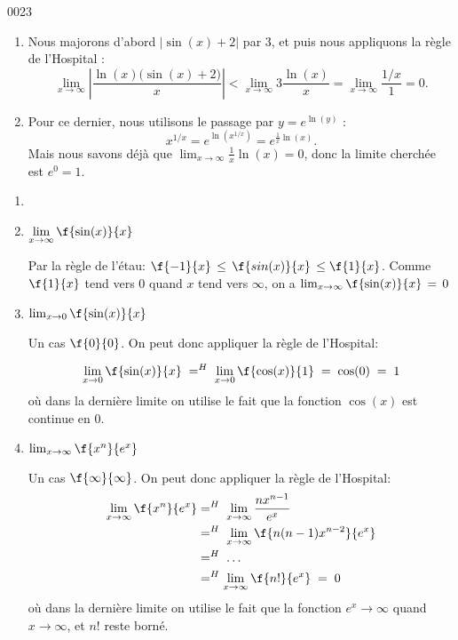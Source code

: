 \begin{corrige}{0023}
\begin{enumerate}
\item
Nous majorons d'abord $|\sin(x)+2|$ par $3$, et puis nous appliquons la règle de l'Hospital :
\begin{equation}
	\lim_{x\to\infty}\left| \frac{ \ln(x)\big( \sin(x)+2 \big) }{ x } \right|<\lim_{x\to\infty}3\frac{ \ln(x) }{ x }=\lim_{x\to\infty}\frac{ 1/x }{ 1 }=0.
\end{equation}

\item
Pour ce dernier, nous utilisons le passage par $y= e^{\ln(y)}$ :
\begin{equation}
	x^{1/x}= e^{\ln(x^{1/x})}= e^{\frac{1}{ x }\ln(x)}.
\end{equation}
Mais nous savons déjà que $\lim_{x\to\infty}\frac{1}{ x }\ln(x)=0$, donc la limite cherchée est $ e^{0}=1$.

\end{enumerate}

\begin{alternative}

	\begin{enumerate}

		\item

		\item $\displaystyle{ \lim_{x\rightarrow \infty}\f{\sin(x)}{x}}$

		Par la règle de l'étau: $ \f{-1}{x} \, \leq\, \f{sin(x)}{x} \,\leq \f{1}{x}$. Comme $\f{1}{x}$ tend vers $0$ quand $x$ tend vers $\infty$, on a $ \lim_{x\rightarrow\infty}\f{\sin(x)}{x} \, =\,0$

		\item $ \lim_{x\rightarrow 0}\f{\sin(x)}{x}$

		Un cas $\f{0}{0}$. On peut donc appliquer la règle de l'Hospital:

		 \[\lim_{x\rightarrow 0}\f{\sin(x)}{x} \; =^{H}\; \lim_{x\rightarrow 0}\f{\cos(x)}{1}\;=\; \cos(0)\;=\;1\] o\`{u} dans la dernière limite on utilise le fait que la fonction $\cos(x)$ est continue en $0$.
		 
		 
		 \item $ \lim_{x\rightarrow \infty }\f{x^n}{e^x}$
		 
		Un cas $\f{\infty}{\infty}$. On peut donc appliquer la règle de l'Hospital:
	\begin{equation}
	\begin{aligned}[]
		\lim_{x\rightarrow \infty}\f{x^n}{e^x}&=^H\;  \lim_{x\rightarrow \infty}\frac{nx^{n-1}}{e^x}\\
			&=^H\;  \lim_{x\rightarrow \infty}\f{n(n-1)x^{n-2}}{e^x}\\
			&=^H\; \ldots\\
			&=^H\lim_{x\rightarrow \infty}\f{n!}{e^x}\;=\;0
	\end{aligned}
\end{equation}	 
		 où dans la dernière limite on utilise le fait que la fonction $e^x \rightarrow  \infty$ quand $x\rightarrow  \infty$, et $n!$ reste borné.
		 

\end{enumerate}
\end{alternative}
\end{corrige}
